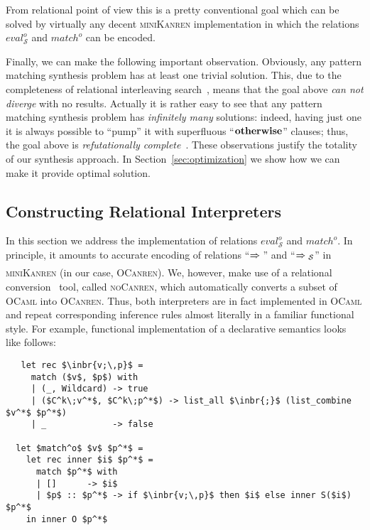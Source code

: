 From relational point of view this is a pretty conventional goal which can be solved by virtually any decent \textsc{miniKanren} implementation in
which the relations $eval^o_{\mathcal S}$ and $match^o$ can be encoded.

Finally, we can make the following important observation. Obviously, any pattern matching synthesis problem has at least one trivial solution.
This, due to the completeness of relational interleaving search~\cite{search,certifiedSemantics}, means that the goal above \emph{can not diverge} with
no results. Actually it is rather easy to see that any pattern matching synthesis problem has \emph{infinitely many} solutions: indeed, having just
one it is always possible to ``pump'' it with superfluous ``$\mathbf{otherwise}$'' clauses; thus, the goal above is \emph{refutationally
complete}~\cite{WillThesis,DivergenceTest}. These observations justify the totality of our synthesis approach. In Section~\ref{sec:optimization} we show
how we can make it provide optimal solution.

\subsection{Constructing Relational Interpreters}
\label{sec:relints}

In this section we address the implementation of relations $eval^o_{\mathcal S}$ and $match^o$. In principle, it amounts to accurate encoding of
relations ``$\xRightarrow{}{}$'' and ``$\xRightarrow{}{}_{\mathcal S}$'' in \textsc{miniKanren} (in our case, \textsc{OCanren}). We, however,
make use of a relational conversion~\cite{conversion} tool, called \textsc{noCanren}, which automatically converts a subset of \textsc{OCaml} into
\textsc{OCanren}. Thus, both interpreters are in fact implemented in \textsc{OCaml} and repeat corresponding inference rules almost
literally in a familiar functional style. For example, functional implementation of a declarative semantics looks like follows:

\begin{lstlisting}
   let rec $\inbr{v;\,p}$ =
     match ($v$, $p$) with
     | (_, Wildcard) -> true
     | ($C^k\;v^*$, $C^k\;p^*$) -> list_all $\inbr{;}$ (list_combine $v^*$ $p^*$)
     | _             -> false

  let $match^o$ $v$ $p^*$ =
    let rec inner $i$ $p^*$ =
      match $p^*$ with
      | []      -> $i$
      | $p$ :: $p^*$ -> if $\inbr{v;\,p}$ then $i$ else inner S($i$) $p^*$
    in inner O $p^*$
\end{lstlisting}

